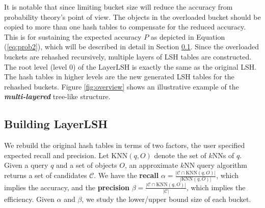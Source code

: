It is notable that since limiting bucket size will reduce the accuracy from probability theory's point of view. The objects in the overloaded bucket should be copied to more than one hash tables to compensate for the reduced accuracy. This is for sustaining the expected accuracy $P$ as depicted in Equation (\ref{eq:prob2}), which will be described in detail in Section \ref{sec:layerlsh:param}. Since the overloaded buckets are rehashed recursively, multiple layers of LSH tables are constructed. The root level (level 0) of the LayerLSH is exactly the same as the original LSH. The hash tables in higher levels are the new generated LSH tables for the rehashed buckets. Figure \ref{fig:overview} shows an illustrative example of the \emph{\textbf{multi-layered}} tree-like structure.



\subsection{Building LayerLSH}
\label{sec:layerlsh:param}

We rebuild the original hash tables in terms of two factors, the user specified expected recall and precision. Let $\text{KNN}(q,O)$ denote the set of $k$NNs of $q$. Given a query $q$ and a set of objects $O$, an approximate $k$NN query algorithm returns a set of candidates $\mathcal{C}$. We have the \textbf{recall} $\alpha=\frac{|\mathcal{C}\cap \text{KNN}(q,O)|}{|\text{KNN}(q,O)|}$, which implies the accuracy, and the \textbf{precision} $\beta=\frac{|\mathcal{C}\cap \text{KNN}(q,O)|}{|\mathcal{C}|}$, which implies the efficiency. Given $\alpha$ and $\beta$, we study the lower/upper bound size of each bucket.


